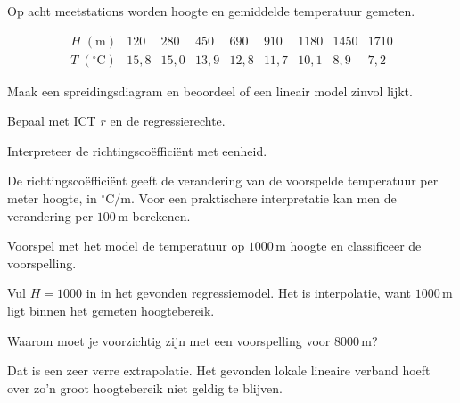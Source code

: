 \documentclass{ximera}
\begin{document}
\begin{oefening}{\oefU \ESS}

Op acht meetstations worden hoogte en gemiddelde temperatuur gemeten.

\[
\begin{array}{c|rrrrrrrr}
H\;(\mathrm m)&120&280&450&690&910&1180&1450&1710\\ \hline
T\;({}^{\circ}\mathrm C)&15{,}8&15{,}0&13{,}9&12{,}8&11{,}7&10{,}1&8{,}9&7{,}2
\end{array}
\]

\begin{question}
Maak een spreidingsdiagram en beoordeel of een lineair model zinvol
lijkt.
\end{question}

\begin{question}
Bepaal met ICT $r$ en de regressierechte.
\end{question}

\begin{question}
Interpreteer de richtingscoëfficiënt met eenheid.

\begin{oplossing}
De richtingscoëfficiënt geeft de verandering van de voorspelde
temperatuur per meter hoogte, in ${}^{\circ}\mathrm C/\mathrm m$.
Voor een praktischere interpretatie kan men de verandering per
$100\,\mathrm m$ berekenen.
\end{oplossing}
\end{question}

\begin{question}
Voorspel met het model de temperatuur op $1000\,\mathrm m$ hoogte en
classificeer de voorspelling.

\begin{oplossing}
Vul $H=1000$ in in het gevonden regressiemodel. Het is interpolatie,
want $1000\,\mathrm m$ ligt binnen het gemeten hoogtebereik.
\end{oplossing}
\end{question}

\begin{question}
Waarom moet je voorzichtig zijn met een voorspelling voor
$8000\,\mathrm m$?

\begin{oplossing}
Dat is een zeer verre extrapolatie. Het gevonden lokale lineaire
verband hoeft over zo'n groot hoogtebereik niet geldig te blijven.
\end{oplossing}
\end{question}
\end{oefening}
\end{document}
